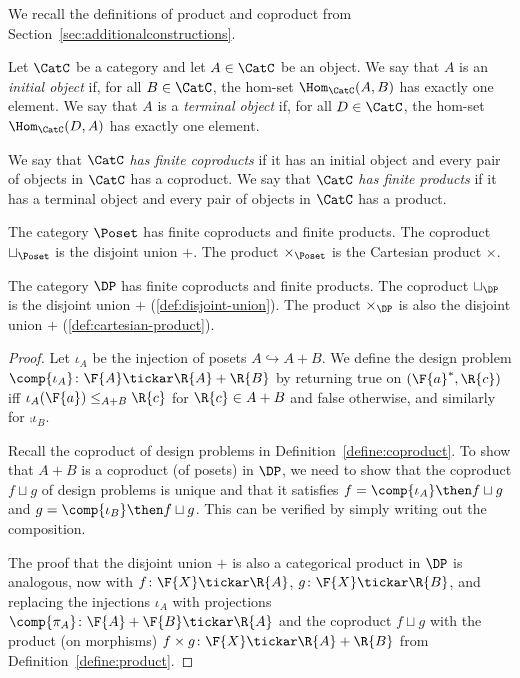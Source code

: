 We recall the definitions of product and coproduct from Section~\ref{sec:additionalconstructions}.


\begin{shaded}
\begin{definition}
Let $\CatC$ be a category and let $A \in \CatC$ be an object. We say that $A$ is an \emph{initial object} if, for all $B \in\CatC$, the hom-set $\Hom_\CatC(A,B)$ has exactly one element. We say that $A$ is a \emph{terminal object} if, for all $D\in\CatC$, the hom-set $\Hom_\CatC(D,A)$ has exactly one element.
\end{definition}

\begin{definition}
We say that $\CatC$ \emph{has finite coproducts} if it has an initial object and every pair of objects in $\CatC$ has a coproduct.
We say that $\CatC$ \emph{has finite products} if it has a terminal object and every pair of objects in $\CatC$ has a product.
\end{definition}
\end{shaded}

\begin{example}
    The category $\Poset$ has finite coproducts and finite products.
    The coproduct $\sqcup_\Poset$ is the disjoint union $+$.
    The product $\times_\Poset$ is the Cartesian product $\times$.
\end{example}

\begin{lemma}
    The category $\DP$ has finite coproducts and finite products.
    The coproduct $\sqcup_\DP$ is the disjoint union $+$ (\cref{def:disjoint-union}).
    The product $\times_\DP$ is also the disjoint union $+$ (\cref{def:cartesian-product}).
\end{lemma}

\begin{proof}
Let $\iota_A$ be the injection of posets $A \hookrightarrow A+B$. We define the design problem $\comp{\iota_A} \colon \F{A} \tickar \R{A} + \R{B}$ by returning true on $(\F{a}^*,\R{c})$ iff $\iota_A(\F{a}) \leq_{A+B} \R{c}$ for $\R{c} \in A + B$ and false otherwise, and similarly for $\comp{\iota_B}$.

Recall the coproduct of design problems in Definition~\ref{define:coproduct}. To show that $A+B$ is a coproduct (of posets) in $\DP$, we need to show that the coproduct $f \sqcup g$ of design problems is unique and that it satisfies $f = \comp{\iota_A} \then f \sqcup g$ and $g = \comp{\iota_B} \then f \sqcup g$. This can be verified by simply writing out the composition.


The proof that the disjoint union $+$ is also a categorical product in $\DP$ is analogous, now with $f \colon \F{X} \tickar \R{A}$, $g \colon \F{X} \tickar \R{B}$, and replacing the injections $\iota_A$ with projections $\comp{\pi_A} \colon \F{A}+\F{B} \tickar \R{A}$ and the coproduct $f \sqcup g$ with the product (on morphisms) $f \times g \colon \F{X} \tickar \R{A} + \R{B}$ from Definition~\ref{define:product}.
\end{proof}

